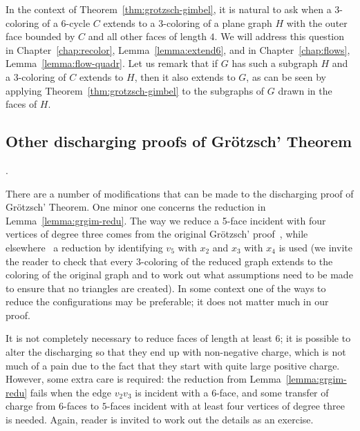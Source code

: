 \documentclass[12pt,twoside,openright,a4paper]{book}
\begin{document}
In the context of Theorem~\ref{thm:grotzsch-gimbel}, it is natural to ask when a $3$-coloring of a $6$-cycle $C$
extends to a $3$-coloring of a plane graph $H$ with the outer face bounded by $C$ and all other faces of length $4$.
We will address this question in Chapter~\ref{chap:recolor}, Lemma~\ref{lemma:extend6}, and in Chapter~\ref{chap:flows}, Lemma~\ref{lemma:flow-quadr}.
Let us remark that if $G$ has such a subgraph $H$ and a $3$-coloring of $C$ extends to $H$, then it also extends
to $G$, as can be seen by applying Theorem~\ref{thm:grotzsch-gimbel} to the subgraphs of $G$ drawn in the faces of $H$.

\subsection{Other discharging proofs of Gr\"otzsch' Theorem}.

There are a number of modifications that can be made to the discharging proof of Gr\"otzsch' Theorem.
One minor one concerns the reduction in Lemma~\ref{lemma:grgim-redu}. The way we reduce a 5-face incident with
four vertices of degree three comes from the original Gr\"otzsch' proof~\cite{grotzsch1959}, while
elsewhere~\cite{thom-torus} a reduction by identifying $v_5$ with $x_2$ and $x_3$ with $x_4$ is used
(we invite the reader to check that every $3$-coloring of the reduced graph extends to the coloring
of the original graph and to work out what assumptions need to be made to ensure that no triangles are created).
In some context one of the ways to reduce the configurations may be preferable; it does not matter much in our
proof.

It is not completely necessary to reduce faces of length at least 6; it is possible to
alter the discharging so that they end up with non-negative charge, which is not much of a pain due to the
fact that they start with quite large positive charge.  However, some extra care is required: the reduction
from Lemma~\ref{lemma:grgim-redu} fails when the edge $v_2v_3$ is incident with a $6$-face, and some transfer of
charge from $6$-faces to $5$-faces incident with at least four vertices of degree three is needed.
Again, reader is invited to work out the details as an exercise.
\end{document}
